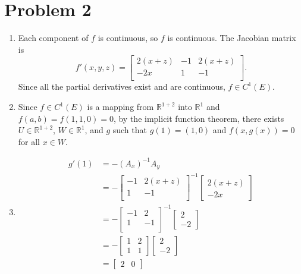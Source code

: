 \documentclass{article}
\begin{document}
\section*{Problem 2}
\begin{enumerate}
  \item Each component of $f$ is continuous, so $f$ is continuous.
  The Jacobian matrix is
  \[  
    f'(x,y,z) = 
    \begin{bmatrix}
      2(x+z) & -1 & 2(x+z) \\
      -2x & 1 & -1 \\
    \end{bmatrix}.
  \]
  Since all the partial derivatives exist and are continuous, $f \in C^1(E)$.
  \item Since $f \in C^1(E)$ is a mapping from $\mathbb{R}^{1+2}$ into $\mathbb{R}^1$
  and  $f(a,b) =f(1,1,0) = 0$, by the implicit function theorem, there exists $U \in \mathbb{R}^{1+2}$, 
  $W \in \mathbb{R}^1$, and $g$ such that $g(1) = (1,0)$ and $f(x,g(x)) = 0$ for all $x \in W$.
  \item 
  \begin{align*}
    g'(1) &= -(A_x)^{-1}A_y \\
    &= -\begin{bmatrix}
      -1 & 2(x+z) \\
      1 & -1 \\
    \end{bmatrix}^{-1}
    \begin{bmatrix}
      2(x+z) \\ -2x
    \end{bmatrix} \\
    &= -\begin{bmatrix}
      -1 & 2 \\
      1 & -1 \\
    \end{bmatrix}^{-1}
    \begin{bmatrix}
      2 \\ -2
    \end{bmatrix} \\
    &= -\begin{bmatrix}
      1 & 2 \\
      1 & 1
    \end{bmatrix}
    \begin{bmatrix}
      2 \\ -2
    \end{bmatrix} \\
    &= \begin{bmatrix}
      2 & 0
    \end{bmatrix}
  \end{align*} 

\end{enumerate}
\end{document}

